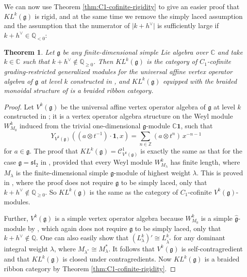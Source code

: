 \documentclass[11pt, reqno]{amsart}
\newtheorem{thm}{Theorem}[section]
\theoremstyle{definition}\newtheorem{defi}[thm]{Definition}
\theoremstyle{definition}\newtheorem{rem}[thm]{Remark}
\theoremstyle{definition}\newtheorem{exam}[thm]{Example}
\theoremstyle{definition}\newtheorem{assum}[thm]{Assumption}
\newcommand{\cC}{\mathcal{C}}
\newcommand{\CC}{\mathbb{C}}
\newcommand{\ZZ}{\mathbb{Z}}
\newcommand{\QQ}{\mathbb{Q}}
\newcommand{\vac}{\mathbf{1}}
\begin{document}
We can now use Theorem \ref{thm:C1-cofinite-rigidity} to give an easier proof that $KL^k(\mathfrak{g})$ is rigid, and at the same time we remove the simply laced assumption and the assumption that the numerator of $\vert k+h^\vee\vert$ is sufficiently large if $k+h^\vee\in\QQ_{<0}$:

\begin{thm}
Let $\mathfrak{g}$ be any finite-dimensional simple Lie algebra over $\CC$ and take $k\in\CC$ such that $k+h^\vee\notin\QQ_{\geq 0}$. Then $KL^k(\mathfrak{g})$ is the category of $C_1$-cofinite grading-restricted generalized modules for the universal affine vertex operator algebra of $\mathfrak{g}$ at level $k$ constructed in \cite{FZ}, and $KL^k(\mathfrak{g})$ equipped with the braided monoidal structure of \cite{HLZ8} is a braided ribbon category.
\end{thm}
\begin{proof}
Let $V^k(\mathfrak{g})$ be the universal affine vertex operator algebra of $\mathfrak{g}$ at level $k$ constructed in \cite{FZ}; it is a vertex operator algebra structure on the Weyl module $W^k_{M_0}$ induced from the trivial one-dimensional $\mathfrak{g}$-module $\CC\vac$, such that
\begin{equation*}
Y_{V^k(\mathfrak{g})}((a\otimes t^{-1})\cdot\vac,x) =\sum_{n\in\ZZ} (a\otimes t^n)\,x^{-n-1}
\end{equation*}
for $a\in\mathfrak{g}$.
The proof that $KL^k(\mathfrak{g})=\cC^1_{V^k(\mathfrak{g})}$ is exactly the same as that for the case $\mathfrak{g}=\mathfrak{sl}_2$ in \cite[Proposition 2.5]{MY}, provided that every Weyl module $W^k_{M_\lambda}$ has finite length, where $M_\lambda$ is the finite-dimensional simple $\mathfrak{g}$-module of highest weight $\lambda$. This is proved in \cite[Proposition 2.14]{KL1}, where the proof does not require $\mathfrak{g}$ to be simply laced, only that $k+h^\vee\notin\QQ_{\geq 0}$. So $KL^k(\mathfrak{g})$ is the same as the category of $C_1$-cofinite $V^k(\mathfrak{g})$-modules.

Further, $V^k(\mathfrak{g})$ is a simple vertex operator algebra because $W^k_{M_0}$ is a simple $\widehat{\mathfrak{g}}$-module by \cite[Proposition 2.12]{KL1}, which again does not require $\mathfrak{g}$ to be simply laced, only that $k+h^\vee\notin\QQ$. One can also easily show that $(L^k_\lambda)'\cong L^k_{\lambda^*}$ for any dominant integral weight $\lambda$, where $M_{\lambda^*}\cong M_\lambda^*$. It follows that $V^k(\mathfrak{g})$ is self-contragredient and that $KL^k(\mathfrak{g})$ is closed under contragredients. Now $KL^k(\mathfrak{g})$ is a braided ribbon category by Theorem \ref{thm:C1-cofinite-rigidity}.
\end{proof}
\end{document}
